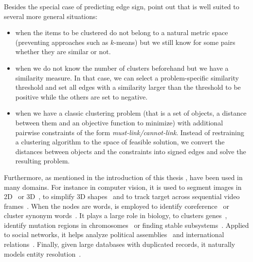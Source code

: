 Besides the special case of predicting edge sign, \textcite[Section 5]{Demaine2006} point out that
\pcc{} is well suited to several more general situations:
\begin{itemize}
   \item when the items to be clustered do not belong to a natural metric space (preventing
      approaches such as $k$-means) but we still know for some pairs whether they are similar or
      not.
   \item when we do not know the number of clusters beforehand but we have a similarity measure. In
      that case, we can select a problem-specific similarity threshold and set all edges with a
      similarity larger than the threshold to be positive while the others are set to negative.
   \item when we have a classic clustering problem (that is a set of objects, a distance between
      them and an objective function to minimize) with additional pairwise constraints of the form
      \emph{must-link/cannot-link}. Instead of restraining a clustering algorithm to the space of
      feasible solution, we convert the distances between objects and the constraints into signed
      edges and solve the resulting \pcc{} problem. 
\end{itemize}

Furthermore, as mentioned in the introduction of this thesis ,
\pcc{} have been used in many
domains. For instance in computer vision, it is used to segment images in
2D~\autocites{Kim2011}{Bagon2011}{CellSeg14} or 3D~\autocites{VolumeSegmentation12}{Beier2015}, to
simplify 3D shapes~\autocite{Shape3D17} and to track target across sequential video
frames~\autocite{multiTracking15}. When the nodes are words, \pcc{} is employed to identify
coreference~\autocites{graphicalCoreference04}{Elsner2009} or cluster synonym
words~\autocite{SignedWordRatings}. It plays a large role in biology, to clusters
genes~\autocite{Ben-Dor99}, identify mutation regions in chromosomes~\autocite{Das2015} or finding
stable subsystems~\autocite{monotoneBiology07}. Applied to social networks, it helps analyze
political assemblies~\autocites{Mendonca2015}{Jiang2015}{BrazilCC17} and international
relations~\autocites{Traag2009}{CommunityUN12}. Finally, given large databases with duplicated
records, it naturally models entity
resolution~\autocites{Crosslingual07}{DeDup09}{LargeScaleDeDup09}{WeightedER14}.
